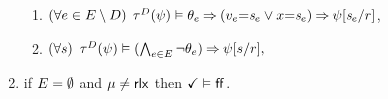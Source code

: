 \begin{definition}
\begin{enumerate}[topsep=0pt,label=(\textsc{r}\arabic*),ref=\textsc{r}\arabic*]
\begin{enumerate}[leftmargin=0pt]
    \item \label{read-tau-independent-ca}
      \begin{math}
        (\forall e\in E\setminus D)
      \end{math}
      \begin{math}
        \aTr{\bEvs}{\bForm} \rimplies
        \cForm_\aEv 
        \limplies
        \PBR{\aVal_\aEv{=}\uReg{\aEv} \lor \aLoc{=}\uReg{\aEv}}
        \limplies
        \bForm[\uReg{\aEv}/\aReg]
      \end{math},
      
    \item \label{read-tau-empty-ca}
      \begin{math}
        (\forall s)
      \end{math}
      \begin{math}
        \aTr{\bEvs}{\bForm} \rimplies 
        (\bigwedge_{\aEv\in\aEvs}\lnot\cForm_\aEv)
        \limplies 
        \bForm[\bReg/\aReg],
      \end{math}  
    \end{enumerate}  
  \item \label{read-term-ca}
    if $E=\emptyset$ and $\mu\neq{\mathsf{rlx}}$ then $\aTerm \rimplies \FALSE$. 
  \end{enumerate}
\end{definition}
